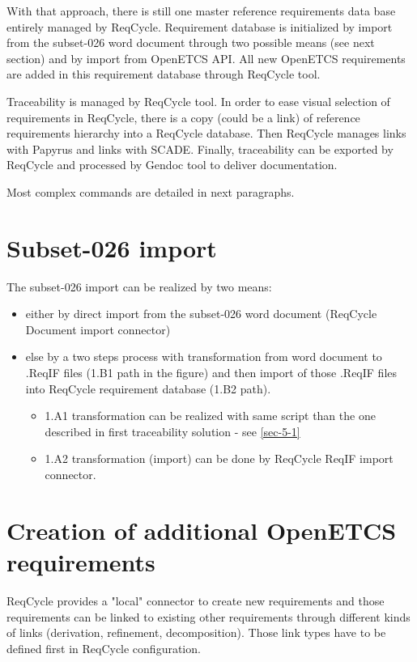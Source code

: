 \documentclass[11pt]{template/openetcs_report}
\begin{document}
With that approach, there is still one master reference requirements data base entirely managed by ReqCycle. Requirement database is initialized by import from the subset-026 word document through two possible means (see next section) and by import from OpenETCS API.
All new OpenETCS requirements are added in this requirement database through ReqCycle tool.

Traceability is managed by ReqCycle tool. In order to ease visual selection of requirements in ReqCycle, there is a copy (could be a link) of reference requirements hierarchy into a ReqCycle database. Then ReqCycle manages links with Papyrus and links with SCADE. 
Finally, traceability can be exported by ReqCycle and processed by Gendoc tool to deliver documentation.

Most complex commands are detailed in next paragraphs.


\section{Subset-026 import}
\label{sec-7-1}
The subset-026 import can be realized by two means:
\begin{itemize}
\item either by direct import from the subset-026 word document (ReqCycle Document import connector)
\item else by a two steps process with transformation from word document to .ReqIF files (1.B1 path in the figure) and then import of those .ReqIF files into ReqCycle requirement database (1.B2 path).
	\begin{itemize}

	\item 1.A1 transformation can be realized with same script than the one described in first traceability solution - see \ref{sec-5-1}

	\item 1.A2 transformation (import) can be done by ReqCycle ReqIF import connector.
	\end{itemize}
\end{itemize}

\section{Creation of additional OpenETCS requirements}
\label{sec-7-2}
ReqCycle provides a "local" connector to create new requirements and those requirements can be linked to existing other requirements through different kinds of links (derivation, refinement, decomposition). Those link types have to be defined first in ReqCycle configuration.
\end{document}
